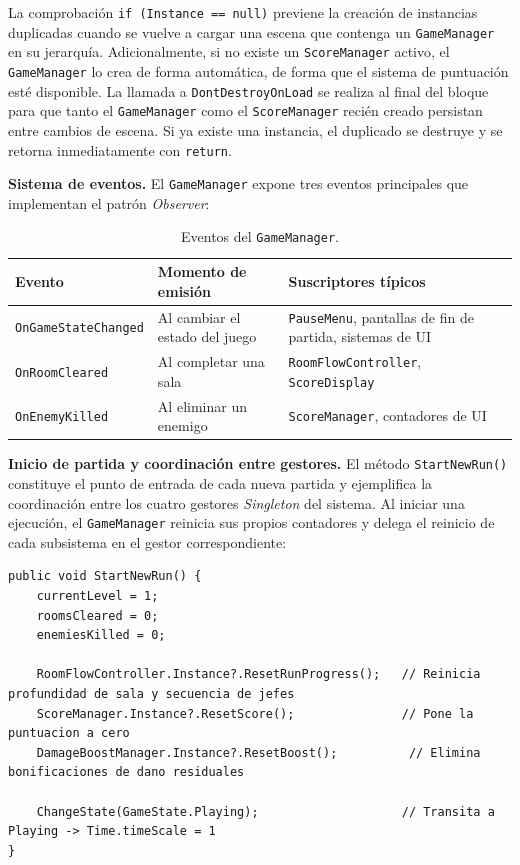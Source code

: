 La comprobación \texttt{if (Instance == null)} previene la creación de instancias duplicadas cuando se vuelve a cargar una escena que contenga un \texttt{GameManager} en su jerarquía. Adicionalmente, si no existe un \texttt{ScoreManager} activo, el \texttt{GameManager} lo crea de forma automática, de forma que el sistema de puntuación esté disponible. La llamada a \texttt{DontDestroyOnLoad} se realiza al final del bloque para que tanto el \texttt{GameManager} como el \texttt{ScoreManager} recién creado persistan entre cambios de escena. Si ya existe una instancia, el duplicado se destruye y se retorna inmediatamente con \texttt{return}.

\textbf{Sistema de eventos.} El \texttt{GameManager} expone tres eventos principales que implementan el patrón \textit{Observer}:

\begin{table}[H]
\centering
{\small
\begin{tabular}{|p{}|p{}|p{}|}
\hline
\textbf{Evento} & \textbf{Momento de emisión} & \textbf{Suscriptores típicos} \\ \hline
\texttt{OnGameStateChanged} & Al cambiar el estado del juego & \texttt{PauseMenu}, pantallas de fin de partida, sistemas de UI \\ \hline
\texttt{OnRoomCleared} & Al completar una sala & \texttt{RoomFlowController}, \texttt{ScoreDisplay} \\ \hline
\texttt{OnEnemyKilled} & Al eliminar un enemigo & \texttt{ScoreManager}, contadores de UI \\ \hline
\end{tabular}
}
\caption{Eventos del \texttt{GameManager}.}
\end{table}

\textbf{Inicio de partida y coordinación entre gestores.} El método \texttt{StartNewRun()} constituye el punto de entrada de cada nueva partida y ejemplifica la coordinación entre los cuatro gestores \textit{Singleton} del sistema. Al iniciar una ejecución, el \texttt{GameManager} reinicia sus propios contadores y delega el reinicio de cada subsistema en el gestor correspondiente:

\begin{lstlisting}
public void StartNewRun() {
    currentLevel = 1;
    roomsCleared = 0;
    enemiesKilled = 0;
    
    RoomFlowController.Instance?.ResetRunProgress();   // Reinicia profundidad de sala y secuencia de jefes
    ScoreManager.Instance?.ResetScore();               // Pone la puntuacion a cero
    DamageBoostManager.Instance?.ResetBoost();          // Elimina bonificaciones de dano residuales
    
    ChangeState(GameState.Playing);                    // Transita a Playing -> Time.timeScale = 1
}
\end{lstlisting}


